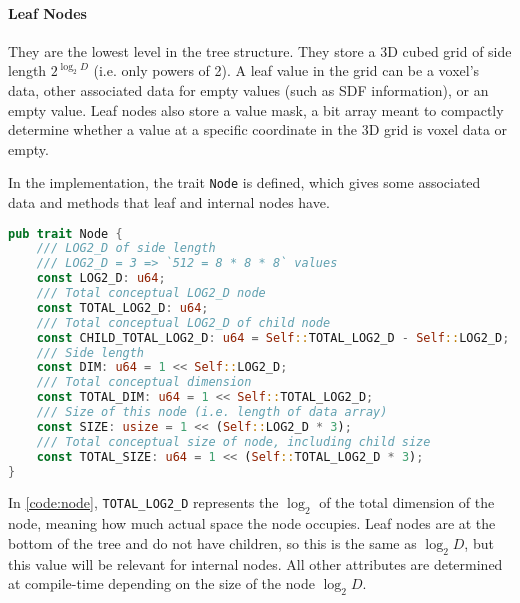 \paragraph{Leaf Nodes} They are the lowest level in the tree structure. They store a 3D cubed grid of side length $2^{\log_{2} D}$ (i.e. only powers of 2). A leaf value in the grid can be a voxel's data, other associated data for empty values (such as SDF information), or an empty value.
Leaf nodes also store a value mask, a bit array meant to compactly determine whether a value at a specific coordinate in the 3D grid is voxel data or empty.

In the implementation, the trait \verb|Node| is defined, which gives some associated data and methods that leaf and internal nodes have.

\begin{lstlisting}[language=rust,caption={\texttt{Node} trait definition},captionpos=b,label={code:node}]
pub trait Node {
    /// LOG2_D of side length
    /// LOG2_D = 3 => `512 = 8 * 8 * 8` values
    const LOG2_D: u64;
    /// Total conceptual LOG2_D node
    const TOTAL_LOG2_D: u64;
    /// Total conceptual LOG2_D of child node
    const CHILD_TOTAL_LOG2_D: u64 = Self::TOTAL_LOG2_D - Self::LOG2_D;
    /// Side length
    const DIM: u64 = 1 << Self::LOG2_D;
    /// Total conceptual dimension
    const TOTAL_DIM: u64 = 1 << Self::TOTAL_LOG2_D;
    /// Size of this node (i.e. length of data array)
    const SIZE: usize = 1 << (Self::LOG2_D * 3);
    /// Total conceptual size of node, including child size
    const TOTAL_SIZE: u64 = 1 << (Self::TOTAL_LOG2_D * 3);
}
\end{lstlisting}

In \cref{code:node}, \verb|TOTAL_LOG2_D| represents the $\log_{2}$ of the total dimension of the node, meaning how much actual space the node occupies. Leaf nodes are at the bottom of the tree and do not have children, so this is the same as $\log_{2} D$, but this value will be relevant for internal nodes. All other attributes are determined at compile-time depending on the size of the node $\log_{2} D$.

